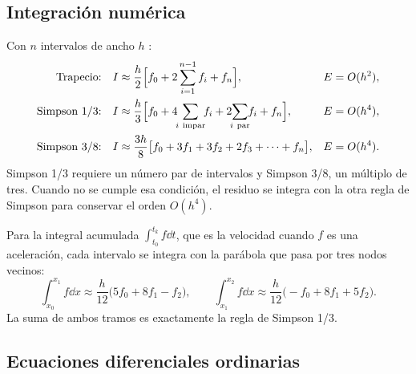 \subsection{Integración numérica}

Con $n$ intervalos de ancho $h$ \parencite{chapra2015}:
\begin{align}
  \text{Trapecio:}\quad & I \approx \frac{h}{2}\Bigl[f_0 + 2\sum_{i=1}^{n-1} f_i + f_n\Bigr], & E &= O(h^2), \\
  \text{Simpson 1/3:}\quad & I \approx \frac{h}{3}\Bigl[f_0 + 4\!\!\sum_{i\ \text{impar}}\!\! f_i + 2\!\!\sum_{i\ \text{par}}\!\! f_i + f_n\Bigr], & E &= O(h^4), \\
  \text{Simpson 3/8:}\quad & I \approx \frac{3h}{8}\bigl[f_0 + 3f_1 + 3f_2 + 2f_3 + \dots + f_n\bigr], & E &= O(h^4).
\end{align}
Simpson 1/3 requiere un número par de intervalos y Simpson 3/8, un múltiplo de tres. Cuando no se cumple esa condición, el residuo se integra con la otra regla de Simpson para conservar el orden $O(h^4)$.

Para la integral acumulada $\int_{t_0}^{t_k} f\dd t$, que es la velocidad cuando $f$ es una aceleración, cada intervalo se integra con la parábola que pasa por tres nodos vecinos:
\begin{equation}
  \int_{x_0}^{x_1} f\dd x \approx \frac{h}{12}\bigl(5f_0 + 8f_1 - f_2\bigr),
  \qquad
  \int_{x_1}^{x_2} f\dd x \approx \frac{h}{12}\bigl(-f_0 + 8f_1 + 5f_2\bigr).
\end{equation}
La suma de ambos tramos es exactamente la regla de Simpson 1/3.

\subsection{Ecuaciones diferenciales ordinarias}

